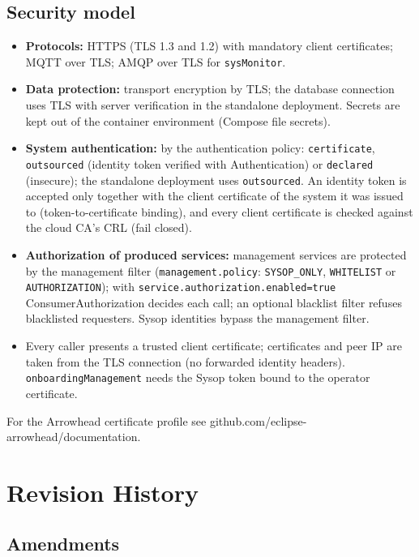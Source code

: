 \documentclass[a4paper]{arrowhead}
\begin{document}
\subsection{Security model}


\begin{itemize}
  \item \textbf{Protocols:} HTTPS (TLS 1.3 and 1.2) with mandatory client certificates; MQTT over TLS; AMQP over TLS for \texttt{sysMonitor}.
  \item \textbf{Data protection:} transport encryption by TLS; the database connection uses TLS with server verification in the standalone deployment. Secrets are kept out of the container environment (Compose file secrets).
  \item \textbf{System authentication:} by the authentication policy: \texttt{certificate}, \texttt{outsourced} (identity token verified with Authentication) or \texttt{declared} (insecure); the standalone deployment uses \texttt{outsourced}. An identity token is accepted only together with the client certificate of the system it was issued to (token-to-certificate binding), and every client certificate is checked against the cloud CA's CRL (fail closed).
  \item \textbf{Authorization of produced services:} management services are protected by the management filter (\texttt{management.policy}: \texttt{SYSOP\_ONLY}, \texttt{WHITELIST} or \texttt{AUTHORIZATION}); with \texttt{service.authorization.enabled=true} ConsumerAuthorization decides each call; an optional blacklist filter refuses blacklisted requesters. Sysop identities bypass the management filter.
  \item Every caller presents a trusted client certificate; certificates and peer IP are taken from the TLS connection (no forwarded identity headers). \texttt{onboarding\allowbreak{}Management} needs the Sysop token bound to the operator certificate.
\end{itemize}

For the Arrowhead certificate profile see github.com/eclipse-arrowhead/documentation.





\newpage

\section{Revision History}
\subsection{Amendments}
\end{document}
